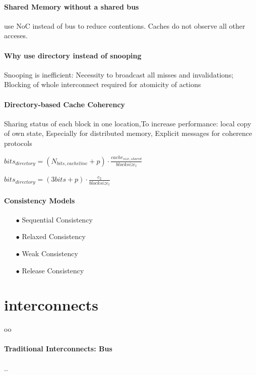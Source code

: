 \documentclass[fontsize=8pt]{scrartcl}
\newcommand{\coloreq}[1]{\colorbox{nordicRed}{\(\displaystyle #1\)}}
\begin{document}
\begin{multicols*}{4}
\paragraph{Shared Memory without a shared bus} use NoC instead of bus to reduce contentions. Caches do not observe all other acceses.

\paragraph{Why use directory instead of snooping} Snooping is inefficient: Necessity to broadcast all misses and invalidations; Blocking of whole interconnect required for atomicity of actions

\paragraph{Directory-based Cache Coherency}

Sharing status of each block in one location,To increase performance: local copy of own state, Especially for distributed memory, Explicit messages for coherence protocols

\noindent
\coloreq{bits_{directory} = (N_{bits,cacheline} + p) \cdot \frac{cache_{size,shared}}{blocksize_l}}

\coloreq{bits_{directory} = (3bits + p) \cdot \frac{c_2}{blocksize_l}}

\paragraph{Consistency Models}

\begin{enumerate}
  \item[$\bullet$] Sequential Consistency
  \item[$\bullet$] Relaxed Consistency
  \item[$\bullet$] Weak Consistency 
  \item[$\bullet$] Release Consistency
\end{enumerate}

\section{interconnects} oo

\paragraph{Traditional Interconnects: Bus} ..


\end{multicols*}
\end{document}
